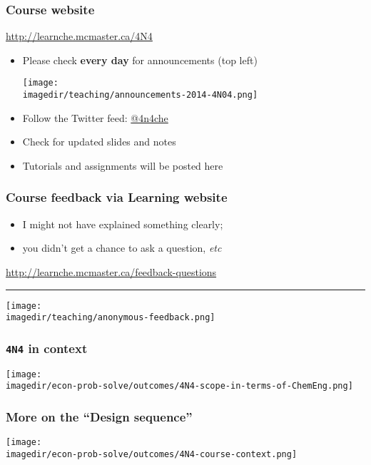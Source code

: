 \begin{frame}\frametitle{Course website}
	\begin{exampleblock}{}
		\centering
		\href{http://learnche.mcmaster.ca/4N4}{http://learnche.mcmaster.ca/4N4}
	\end{exampleblock}
	\begin{itemize}
		\item	Please check \textbf{every day} for announcements {\tiny (top left)}
		\begin{flushright}
			\texttt{[image: \\imagedir/teaching/announcements-2014-4N04.png]}
		\end{flushright}

		\vspace{-1cm}
		\item	Follow the Twitter feed: \href{https://twitter.com/4n4che}{@4n4che}
		\item	Check for updated slides and notes
		\item	Tutorials and assignments will be posted here
	\end{itemize}
\end{frame}

\begin{frame}\frametitle{Course feedback via Learning website}
	\begin{itemize}
		\item	I might not have explained something clearly;
		\item	you didn't get a chance to ask a question, \emph{etc}
	\end{itemize}
	\href{http://learnche.mcmaster.ca/feedback-questions}{http://learnche.mcmaster.ca/feedback-questions}
	\vspace{12pt}
	\hrule
	\begin{center}
		\texttt{[image: \\imagedir/teaching/anonymous-feedback.png]}
	\end{center}
\end{frame}

\begin{frame}\frametitle{\texttt{4N4} in context}
	\begin{center}
		\texttt{[image: \\imagedir/econ-prob-solve/outcomes/4N4-scope-in-terms-of-ChemEng.png]}
	\end{center}
\end{frame}

\begin{frame}\frametitle{More on the ``Design sequence''}
	\begin{center}
		\texttt{[image: \\imagedir/econ-prob-solve/outcomes/4N4-course-context.png]}
	\end{center}
\end{frame}

